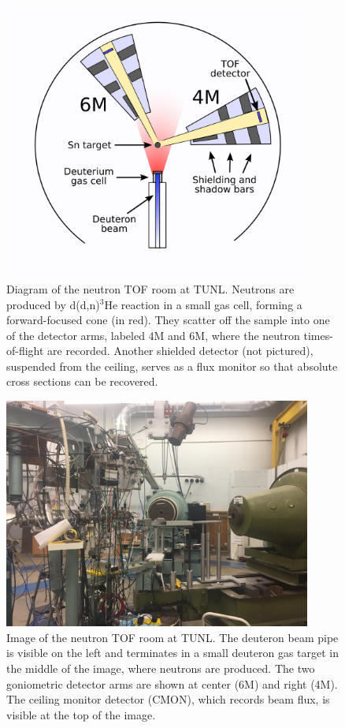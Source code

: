 \begin{table}[ht]
\begin{figure}[h]
    \centering
    \includegraphics[width = 0.9\textwidth]{figures/ExperimentalSetupTUNL.png}
    \caption[Diagram of the neutron TOF room at TUNL] 
    {
        Diagram of the neutron TOF room at TUNL. Neutrons are produced by d(d,n)$^{3}$He reaction in
        a small gas cell, forming a forward-focused cone (in red). They scatter
        off the sample into one of the detector arms, labeled 4M and 6M, where the neutron
        times-of-flight are recorded. Another shielded detector (not pictured), suspended from the 
        ceiling, serves as a flux monitor so that absolute cross sections can be recovered.
    }
    \label{ExperimentalSetupTUNL}
\end{figure}

\begin{figure}[h]
    \centering
    \includegraphics[width = 0.9\textwidth]{figures/TOFRoomPhoto.jpg}
    \caption[Image of the neutron TOF room at TUNL] 
    {
    Image of the neutron TOF room at TUNL. The deuteron beam pipe is visible on the left and
    terminates in a small deuteron gas target in the middle of the image, where neutrons are
    produced. The two goniometric detector arms are shown at center (6M) and right (4M). The ceiling
    monitor detector (CMON), which records beam flux, is visible at the top of the image.
    }
    \label{TOFRoomPhoto}
\end{figure}


\end{table}
